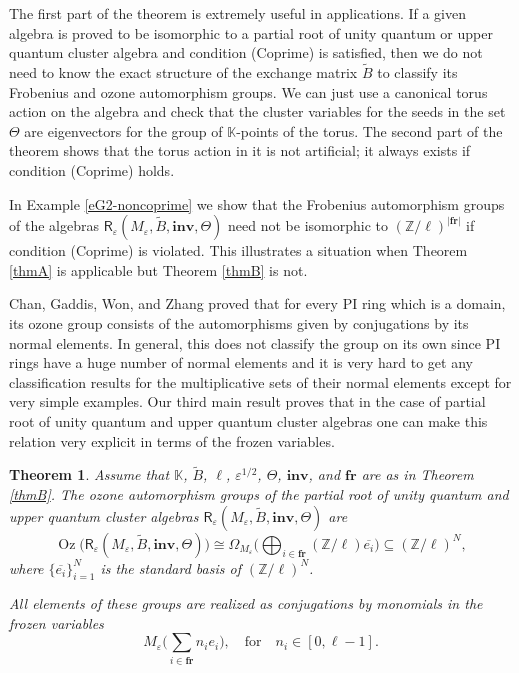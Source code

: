 \documentclass[11pt]{amsart}
\theoremstyle{plain}
\newcommand \exref[1]{Example \ref{e#1}}
\newtheorem{thmintro}{Theorem}
\def \KK {{\mathbb C}}
\def \KK {{\mathbb K}}
\def \Zset {{\mathbb Z}}
\def \R {{\boldsymbol{\mathsf R}}}
\def \B  {{\widetilde{B}}}
\newcommand \fr {{\mathbf{fr}}}
\newcommand \inv {{\mathbf{inv}}}
\def \Om {\Omega}
\def \ep {\varepsilon}
\def \ol {\overline}
\DeclareMathOperator \Oz { {\mathrm{Oz}}}
\begin{document}
The first part of the theorem is extremely useful in applications. If a given algebra is proved to be isomorphic to a partial root of unity quantum or upper quantum cluster algebra and condition (Coprime) is satisfied, then we do not need to know the exact structure of the exchange matrix $\B$ to classify its Frobenius and ozone automorphism groups. We can just use a canonical torus action on the algebra and check that the cluster variables for the seeds in the set $\Theta$ are eigenvectors for the group of $\KK$-points of the torus. The second part of the theorem shows that the torus action in it is not artificial; it always exists if condition (Coprime) holds.  

In \exref{G2-noncoprime} we show that the Frobenius automorphism groups of the algebras $\R_\ep(M_\ep, \B, \inv, \Theta)$ need not be isomorphic to $(\Zset/ \ell)^{|\fr|}$ if condition (Coprime) is violated. This illustrates a situation 
when Theorem \ref{thmA} is applicable but Theorem \ref{thmB} is not. 

Chan, Gaddis, Won, and Zhang \cite{CGWZ2} proved that for every PI ring which is a domain, its ozone group consists of the automorphisms 
given by conjugations by its normal elements. In general, this does not classify the group on its own since PI rings have a huge number 
of normal elements and it is very hard to get any classification results for the multiplicative sets of their normal elements except for very simple examples.  
Our third main result proves that in the case of partial root of
unity quantum and upper quantum cluster algebras one can make this relation very explicit in terms of the frozen variables. 

\begin{thmintro} 
\label{thmC}
Assume that $\KK$, $\B$, $\ell$, $\ep^{1/2}$, $\Theta$, $\inv$, and $\fr$ are as in Theorem \ref{thmB}. The ozone automorphism groups 
of the partial root of unity quantum and upper quantum cluster algebras $\R_\ep(M_\ep, \B, \inv, \Theta)$ are
\[
\Oz \big( \R_\ep(M_\ep, \B, \inv, \Theta) \big) \cong \Om_{M_\ep} \Big( \bigoplus_{i \in \fr} (\Zset/\ell) \ol{e_i} \Big) \subseteq (\Zset/\ell)^N,
\]
where $\{ \ol{e_i} \}_{i=1}^N$ is the standard basis of $(\Zset/\ell)^N$. 

All elements of these groups are realized as conjugations by monomials in the frozen variables 
\[
M_\ep \Big( \sum_{i \in \fr} n_i e_i \Big), \quad \mbox{for} \quad n_i \in [0, \ell -1].
\]
\end{thmintro} 
\end{document}
